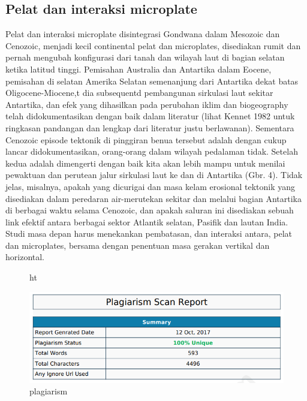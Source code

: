 \subsection{Pelat dan interaksi microplate}

		Pelat dan interaksi microplate disintegrasi Gondwana dalam Mesozoic dan Cenozoic, menjadi kecil continental pelat dan microplates, disediakan rumit 
	dan pernah mengubah konfigurasi dari tanah dan wilayah laut di bagian selatan ketika latitud tinggi. Pemisahan Australia dan Antartika dalam Eocene, 
	pemisahan di selatan Amerika Selatan semenanjung dari Antartika dekat batas Oligocene-Miocene,t dia subsequentd pembangunan sirkulasi laut sekitar 
	Antartika, dan efek yang dihasilkan pada perubahan iklim dan biogeography telah didokumentasikan dengan baik dalam literatur (lihat Kennet 1982 untuk 
	ringkasan pandangan dan lengkap dari literatur justu berlawanan). Sementara Cenozoic episode tektonik di pinggiran benua tersebut adalah dengan cukup 
	lancar didokumentasikan, orang-orang dalam wilayah pedalaman tidak. Setelah kedua adalah dimengerti dengan baik kita akan lebih mampu untuk menilai 
	pewaktuan dan perutean jalur sirkulasi laut ke dan di Antartika (Gbr. 4). Tidak jelas, misalnya, apakah yang dicurigai dan masa kelam erosional tektonik 
	yang disediakan dalam peredaran air-merutekan sekitar dan melalui bagian Antartika di berbagai waktu selama Cenozoic, dan apakah saluran ini disediakan 
	sebuah link efektif antara berbagai sektor Atlantik selatan, Pasifik dan lautan India. Studi masa depan harus menekankan pembatasan, dan interaksi antara, 
	pelat dan microplates, bersama dengan penentuan masa gerakan vertikal dan horizontal.
	
	
	
	
\begin{figure}{ht}
\centerline{\includegraphics[width=1\textwidth]{figures/plag.PNG}}
\caption{plagiarism}	
\label{plag}
\end{figure}

	
		
	
	
		
